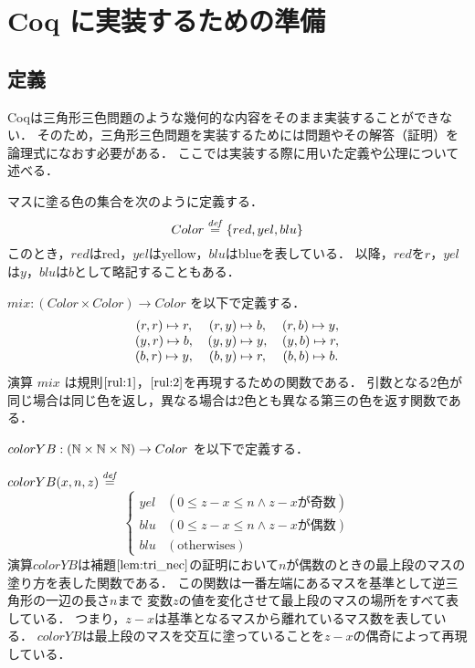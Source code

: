 \section{ Coq に実装するための準備}
\subsection{定義}
Coqは三角形三色問題のような幾何的な内容をそのまま実装することができない．
そのため，三角形三色問題を実装するためには問題やその解答（証明）を論理式になおす必要がある．
ここでは実装する際に用いた定義や公理について述べる．
\begin{dfn}[$Color$]
  マスに塗る色の集合を次のように定義する．
  \[
  Color \overset{{\it def}}{=} \{red, yel, blu\}
  \]
  このとき，$red$はred，$yel$はyellow，$blu$はblueを表している．
  以降，$red$を$r$，$yel$は$y$，$blu$は$b$として略記することもある．
\end{dfn}
\begin{dfn}[$mix$]
  $mix : (Color \times Color ) \to Color$ を以下で定義する．
  \[
  \begin{tabular}{ccccc}
    $(r,r) \Pto r,$ & $(r,y) \Pto b,$ & $(r,b) \Pto y,$ \\
    $(y,r) \Pto b,$ & $(y,y) \Pto y,$ & $(y,b) \Pto r,$ \\
    $(b,r) \Pto y,$ & $(b,y) \Pto r,$ & $(b,b) \Pto b.$ \\
  \end{tabular}
  \]
  演算 $mix$ は規則$\ref{rul:1}$，$\ref{rul:2}$を再現するための関数である．
引数となる$2$色が同じ場合は同じ色を返し，異なる場合は$2$色とも異なる第三の色を返す関数である．
\end{dfn}
\begin{dfn}[$colorYB$]
  $colorYB : (\mathbb{N} \times \mathbb{N} \times \mathbb{N}) \to Color$ を以下で定義する．

  $colorYB(x,n,z) \overset{{\it def}}{=}$
  \[
  \begin{cases}
    yel & (0 \leq z-x \leq n \land z-x\text{が奇数}) \\
    blu & (0 \leq z-x \leq n \land z-x\text{が偶数}) \\
    blu & (\text{otherwises})
  \end{cases}
  \]
  演算$colorYB$は補題$\ref{lem:tri_nec}$の証明において$n$が偶数のときの最上段のマスの塗り方を表した関数である．
  この関数は一番左端にあるマスを基準として逆三角形の一辺の長さ$n$まで
  変数$z$の値を変化させて最上段のマスの場所をすべて表している．
  つまり，$z-x$は基準となるマスから離れているマス数を表している．
  $colorYB$は最上段のマスを交互に塗っていることを$z-x$の偶奇によって再現している．
\end{dfn}

